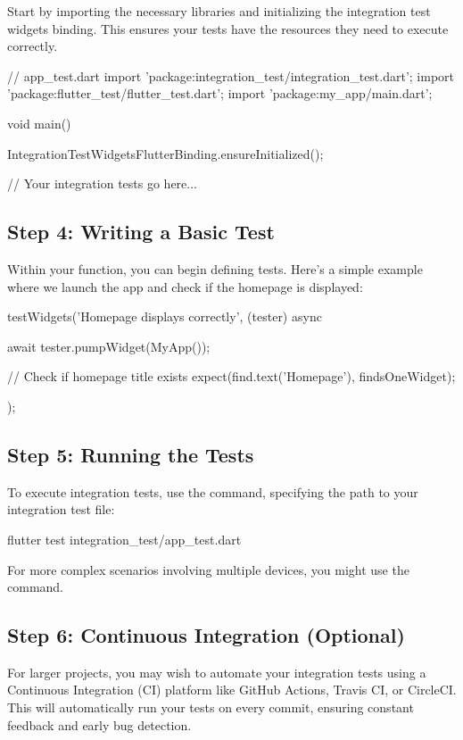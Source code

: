 Start by importing the necessary libraries and initializing the integration test widgets binding. 
This ensures your tests have the resources they need to execute correctly.

\begin{dartcode}
// app_test.dart
import 'package:integration_test/integration_test.dart';
import 'package:flutter_test/flutter_test.dart';
import 'package:my_app/main.dart';

void main() {
  IntegrationTestWidgetsFlutterBinding.ensureInitialized();

  // Your integration tests go here...
}
\end{dartcode}

\subsection*{Step 4: Writing a Basic Test}

Within your  function, you can begin defining tests. Here's a simple example where we launch the app and check if the homepage is displayed:

\begin{dartcode}
testWidgets('Homepage displays correctly', (tester) async {
  await tester.pumpWidget(MyApp());

  // Check if homepage title exists
  expect(find.text('Homepage'), findsOneWidget);
});
\end{dartcode}

\subsection*{Step 5: Running the Tests}

To execute integration tests, use the  command, specifying the path to your integration test file:

\begin{bashcode}
flutter test integration_test/app_test.dart
\end{bashcode}

For more complex scenarios involving multiple devices, you might use the  command.

\subsection*{Step 6: Continuous Integration (Optional)}

For larger projects, you may wish to automate your integration tests using a Continuous Integration (CI) platform like GitHub Actions, Travis CI, or CircleCI. 
This will automatically run your tests on every commit, ensuring constant feedback and early bug detection.

